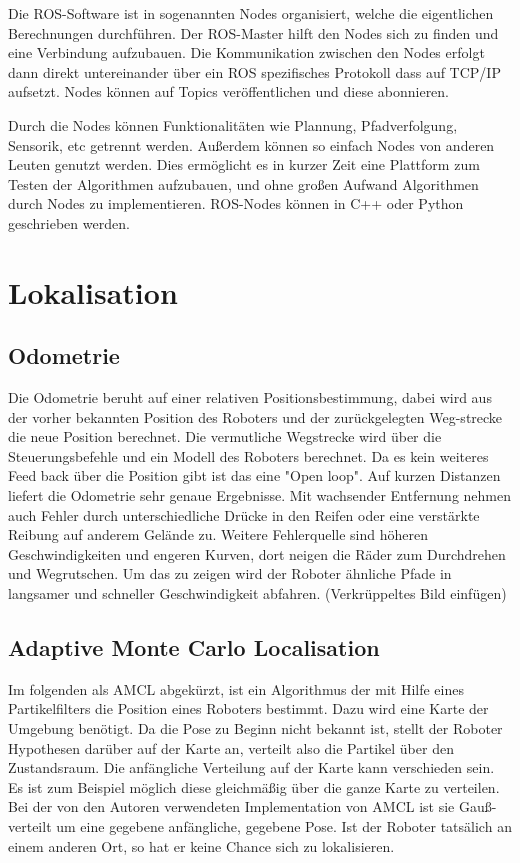 \documentclass[11pt,a4paper]{article}
\begin{document}
{Die ROS-Software ist in sogenannten Nodes organisiert, welche die eigentlichen Berechnungen durchführen. Der ROS-Master hilft den Nodes sich zu finden und eine Verbindung aufzubauen. Die Kommunikation zwischen den Nodes erfolgt dann direkt untereinander über ein ROS spezifisches Protokoll dass auf TCP/IP aufsetzt. Nodes k\"onnen auf Topics ver\"offentlichen und diese abonnieren. \cite{rosConcepts}

Durch die Nodes k\"onnen Funktionalit\"aten wie Plannung, Pfadverfolgung, Sensorik, etc getrennt werden. Au{\ss}erdem k\"onnen so einfach Nodes von anderen Leuten genutzt werden. Dies erm\"oglicht es in kurzer Zeit eine Plattform zum Testen der Algorithmen aufzubauen, und ohne gro{\ss}en Aufwand Algorithmen durch Nodes zu implementieren. ROS-Nodes k\"onnen in C++ oder Python geschrieben werden. 
 

\section{Lokalisation}
\subsection{Odometrie}
{Die Odometrie beruht auf einer relativen Positionsbestimmung, dabei wird aus der vorher bekannten Position des Roboters und der zur\"uckgelegten Weg-strecke die neue Position berechnet. Die vermutliche Wegstrecke wird über die Steuerungsbefehle und ein Modell des Roboters berechnet. Da es kein weiteres Feed back über die Position gibt ist das eine "Open loop". Auf kurzen Distanzen liefert die Odometrie sehr genaue Ergebnisse. Mit wachsender Entfernung nehmen auch Fehler durch unterschiedliche Dr\"ucke in den Reifen oder eine verst\"arkte Reibung auf anderem Gel\"ande zu. Weitere Fehlerquelle sind h\"oheren Geschwindigkeiten und engeren Kurven, dort neigen die R\"ader zum Durchdrehen und Wegrutschen. Um das zu zeigen wird der Roboter \"ahnliche Pfade in langsamer und schneller Geschwindigkeit abfahren. 
	(Verkrüppeltes Bild einfügen)	
}
\newpage

\subsection{Adaptive  Monte Carlo Localisation \cite{mclWiki}}
Im folgenden als AMCL abgek\"urzt, ist ein Algorithmus der mit Hilfe eines Partikelfilters die Position eines Roboters bestimmt. Dazu wird eine Karte der Umgebung ben\"otigt. Da die Pose zu Beginn nicht bekannt ist, stellt der Roboter Hypothesen dar\"uber auf der Karte an, verteilt also die Partikel über den Zustandsraum. Die anf\"angliche Verteilung auf der Karte kann verschieden sein. Es ist zum Beispiel möglich diese  gleichmäßig über die ganze Karte zu verteilen. 
Bei der von den Autoren verwendeten Implementation von AMCL ist sie Gau{\ss}-verteilt um eine gegebene anf\"angliche, gegebene Pose. Ist der Roboter tatsälich an einem anderen Ort, so hat er keine Chance sich zu lokalisieren. 

}
\end{document}
